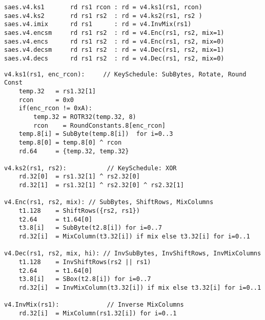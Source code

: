 

\begin{lstlisting}[language=pseudo,style=block]
saes.v4.ks1       rd rs1 rcon : rd = v4.ks1(rs1, rcon)
saes.v4.ks2       rd rs1 rs2  : rd = v4.ks2(rs1, rs2 )
saes.v4.imix      rd rs1      : rd = v4.InvMix(rs1)
saes.v4.encsm     rd rs1 rs2  : rd = v4.Enc(rs1, rs2, mix=1)
saes.v4.encs      rd rs1 rs2  : rd = v4.Enc(rs1, rs2, mix=0)
saes.v4.decsm     rd rs1 rs2  : rd = v4.Dec(rs1, rs2, mix=1)
saes.v4.decs      rd rs1 rs2  : rd = v4.Dec(rs1, rs2, mix=0)
\end{lstlisting}


\begin{lstlisting}[language=pseudo,style=block]
v4.ks1(rs1, enc_rcon):     // KeySchedule: SubBytes, Rotate, Round Const
    temp.32   = rs1.32[1]
    rcon      = 0x0
    if(enc_rcon != 0xA):
        temp.32 = ROTR32(temp.32, 8)
        rcon    = RoundConstants.8[enc_rcon]
    temp.8[i] = SubByte(temp.8[i])  for i=0..3
    temp.8[0] = temp.8[0] ^ rcon
    rd.64     = {temp.32, temp.32}

v4.ks2(rs1, rs2):           // KeySchedule: XOR
    rd.32[0]  = rs1.32[1] ^ rs2.32[0]
    rd.32[1]  = rs1.32[1] ^ rs2.32[0] ^ rs2.32[1]

v4.Enc(rs1, rs2, mix): // SubBytes, ShiftRows, MixColumns
    t1.128    = ShiftRows({rs2, rs1})
    t2.64     = t1.64[0]
    t3.8[i]   = SubByte(t2.8[i]) for i=0..7
    rd.32[i]  = MixColumn(t3.32[i]) if mix else t3.32[i] for i=0..1

v4.Dec(rs1, rs2, mix, hi): // InvSubBytes, InvShiftRows, InvMixColumns
    t1.128    = InvShiftRows(rs2 || rs1)
    t2.64     = t1.64[0]
    t3.8[i]   = SBox(t2.8[i]) for i=0..7
    rd.32[i]  = InvMixColumn(t3.32[i]) if mix else t3.32[i] for i=0..1

v4.InvMix(rs1):             // Inverse MixColumns
    rd.32[i]  = MixColumn(rs1.32[i]) for i=0..1
\end{lstlisting}


